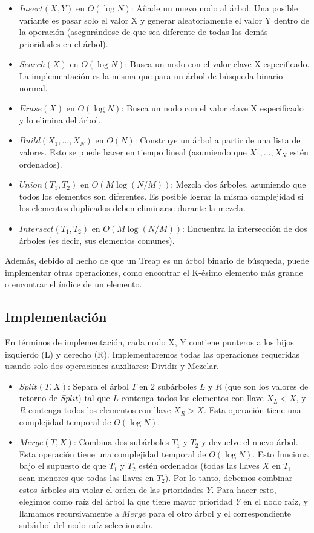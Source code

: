 \documentclass[12pt]{article}
\begin{document}
\begin{itemize}
	\item $Insert(X, Y)$ en $O(\log N)$: Añade un nuevo nodo al árbol. Una posible variante es pasar solo el valor X y generar aleatoriamente el valor Y dentro de la operación (asegurándose de que sea diferente de todas las demás prioridades en el árbol).
	\item $Search(X)$ en $O(\log N)$: Busca un nodo con el valor clave X especificado. La implementación es la misma que para un árbol de búsqueda binario normal.
	\item $Erase(X)$ en $O(\log N)$: Busca un nodo con el valor clave X especificado y lo elimina del árbol.
	\item $Build(X_1, ..., X_N)$ en $O(N)$: Construye un árbol a partir de una lista de valores. Esto se puede hacer en tiempo lineal (asumiendo que $X_1, ..., X_N$ estén ordenados).
	\item $Union(T_1, T_2)$ en $O(M \log (N / M))$: Mezcla dos árboles, asumiendo que todos los elementos son diferentes. Es posible lograr la misma complejidad si los elementos duplicados deben eliminarse durante la mezcla.
	\item $Intersect(T_1, T_2)$ en $O(M \log (N / M))$: Encuentra la intersección de dos árboles (es decir, sus elementos comunes).
\end{itemize}

Además, debido al hecho de que un Treap es un árbol binario de búsqueda, puede implementar otras operaciones, como encontrar el K-ésimo elemento más grande o encontrar el índice de un elemento.

\subsection{Implementación}

En términos de implementación, cada nodo X, Y contiene punteros a los hijos izquierdo (L) y derecho (R). Implementaremos todas las operaciones requeridas usando solo dos operaciones auxiliares: Dividir y Mezclar.

\begin{itemize}
	\item $Split(T, X)$: Separa el árbol $T$ en 2 subárboles $L$ y $R$ (que son los valores de retorno de $Split$) tal que $L$ contenga todos los elementos con llave $X_L < X$, y $R$ contenga todos los elementos con llave $X_R > X$. Esta operación tiene una complejidad temporal de $O(\log N)$.
	\item $Merge(T, X)$: Combina dos subárboles $T_1$ y $T_2$ y devuelve el nuevo árbol. Esta operación tiene una complejidad temporal de $O(\log N)$. Esto funciona bajo el supuesto de que $T_1$ y $T_2$ estén ordenados (todas las llaves $X$ en $T_1$ sean menores que todas las llaves en $T_2$). Por lo tanto, debemos combinar estos árboles sin violar el orden de las prioridades $Y$. Para hacer esto, elegimos como raíz del árbol la que tiene mayor prioridad $Y$ en el nodo raíz, y llamamos recursivamente a $Merge$ para el otro árbol y el correspondiente subárbol del nodo raíz seleccionado.
\end{itemize}
\end{document}
